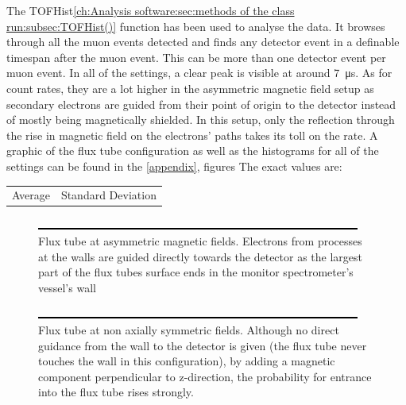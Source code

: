   	
  The TOFHist\ref{ch:Analysis software:sec:methods of the class run:subsec:TOFHist()} function has been used to analyse the data.
  It browses through all the muon events detected and finds any detector event in a definable timespan after the muon event. This can be more than one detector event per  muon event. In all of the settings, a clear peak is visible at around \SI{7}{\micro\second}. As for count rates, they are a lot higher in the asymmetric magnetic field setup as secondary electrons are guided from their point of origin to the detector instead of mostly being magnetically shielded. In this setup, only the reflection through the rise in magnetic field on the electrons' paths takes its toll on the rate.
  A graphic of the flux tube configuration as well as the histograms for all of the settings can be found in the \ref{appendix}, figures 
  The exact values are:
  \begin{table}
  	\begin{tabularx}{0.8\textwidth}{>{\centering}X>{\centering\arraybackslash}X}
  		Average & Standard Deviation\\
  	\end{tabularx}
  \end{table}

  
  
  \begin{figure}
	\includegraphics{graphics/dummy.eps}
	\caption[Asymmetric magnetic field flux tube]{Flux tube at asymmetric magnetic fields. Electrons from processes at the walls are guided directly towards the detector as the largest part of the flux tubes surface ends in the monitor spectrometer's vessel's wall}
  	\label{fig:monSpec:asymmetric magnetic field}
  \end{figure}

    \begin{figure}
	
	\includegraphics{graphics/dummy.eps}
  	\caption[Non-axially symmetric magnetic flux tube]{Flux tube at non axially symmetric fields. Although no direct guidance from the wall to the detector is given (the flux tube never touches the wall in this configuration), by adding a magnetic component perpendicular to z-direction, the probability for entrance into the flux tube rises strongly.}
  	\label{fig:monSpec:non axially symmetric magnetic field}
  \end{figure}
  
